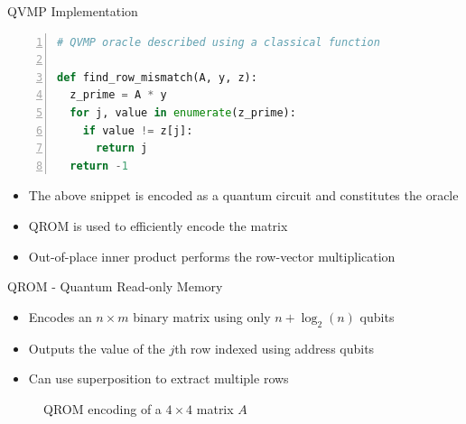 \documentclass[10pt]{beamer}
\begin{document}
\begin{frame}[fragile]{QVMP Implementation}
  \begin{lstlisting}[frame=single,language=Python, numbers=left]
# QVMP oracle described using a classical function

def find_row_mismatch(A, y, z):
  z_prime = A * y
  for j, value in enumerate(z_prime):
    if value != z[j]:
      return j
  return -1
  \end{lstlisting}

  \begin{itemize}
    \item The above snippet is encoded as a quantum circuit and constitutes
      the oracle
    \item QROM is used to efficiently encode the matrix
    \item Out-of-place inner product performs the row-vector multiplication
  \end{itemize}
\end{frame}


\begin{frame}{QROM - Quantum Read-only Memory}
  \begin{itemize}
    \item Encodes an $n \times m$ binary matrix using only $n + \log_2(n)$ qubits
    \item Outputs the value of the $j$th row indexed using address qubits
    \item Can use superposition to extract multiple rows
  \end{itemize}
  \begin{figure}
      \centering
      
      \caption{QROM encoding of a $4 \times 4$ matrix $A$}
      \label{fig:qrom_4x4}
  \end{figure}
\end{frame}


%     
\end{document}
